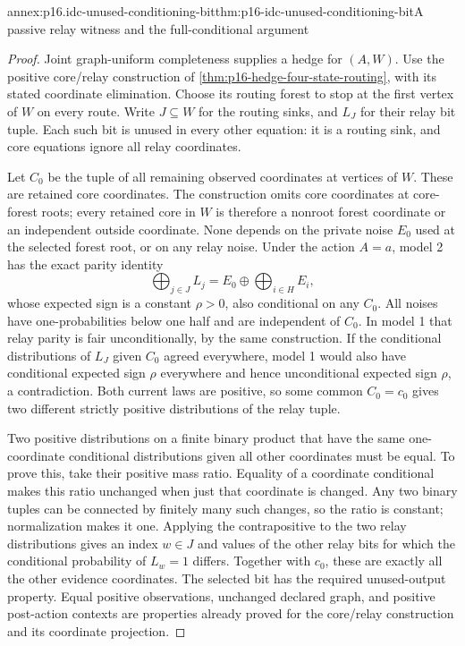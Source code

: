\begin{annexitem}{annex:p16.idc-unused-conditioning-bit}{thm:p16-idc-unused-conditioning-bit}{A passive relay witness and the full-conditional argument}
\begin{proof}
Joint graph-uniform completeness supplies a hedge for \((A,W)\).
Use the positive core/relay construction of
\cref{thm:p16-hedge-four-state-routing}, with its stated coordinate
elimination. Choose its routing forest to stop at the first vertex
of \(W\) on every route. Write \(J\subseteq W\) for
the routing sinks, and \(L_J\) for their relay bit tuple.
Each such bit is unused in every other equation: it is a routing
sink, and core equations ignore all relay coordinates.

Let \(C_0\) be the tuple of all remaining observed coordinates
at vertices of \(W\). These are retained core coordinates.
The construction omits core coordinates at core-forest roots;
every retained core in \(W\) is therefore a nonroot forest
coordinate or an independent outside coordinate. None depends
on the private noise \(E_0\) used at the selected forest root,
or on any relay noise. Under the action \(A=a\), model 2
has the exact parity identity
\[
 \bigoplus_{j\in J}L_j=E_0\oplus\bigoplus_{i\in H}E_i,
\]
whose expected sign is a constant \(\rho>0\), also conditional
on any \(C_0\). All noises have one-probabilities below one half
and are independent of \(C_0\). In model 1 that relay parity
is fair unconditionally, by the same construction. If the conditional
distributions of \(L_J\) given \(C_0\) agreed everywhere,
model 1 would also have conditional expected sign \(\rho\)
everywhere and hence unconditional expected sign \(\rho\), a
contradiction. Both current laws are positive, so some common
\(C_0=c_0\) gives two different strictly positive distributions
of the relay tuple.

Two positive distributions on a finite binary product that have
the same one-coordinate conditional distributions given all other
coordinates must be equal. To prove this, take their positive
mass ratio. Equality of a coordinate conditional makes this ratio
unchanged when just that coordinate is changed. Any two binary
tuples can be connected by finitely many such changes, so the
ratio is constant; normalization makes it one. Applying the
contrapositive to the two relay distributions gives an index
\(w\in J\) and values of the other relay bits for which
the conditional probability of \(L_w=1\) differs. Together
with \(c_0\), these are exactly all the other evidence coordinates.
The selected bit has the required unused-output property. Equal
positive observations, unchanged declared graph, and positive
post-action contexts are properties already proved for the
core/relay construction and its coordinate projection.
\end{proof}
\end{annexitem}

